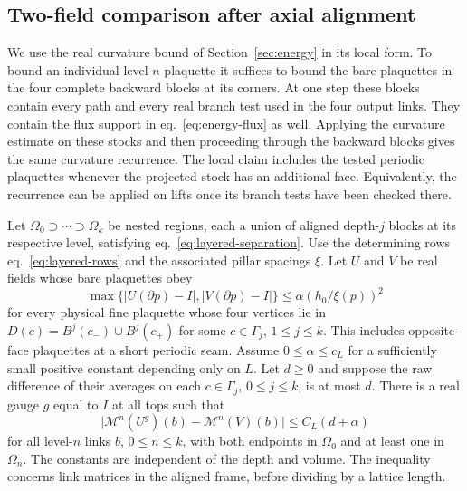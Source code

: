 \documentclass[11pt,letterpaper,reqno]{amsart}
\makeatletter
\numberwithin{equation}{section}
\renewcommand{\eqref}[1]{\textup{eq.~\ref{#1}}}
\theoremstyle{definition}
\newcommand{\ms@minorstart}{%
  \pushQED{\qed}\renewcommand{\qedsymbol}{$\blacksquare$}}
\newenvironment{proposition}[1][]{\ms@minorstart\ms@proposition[#1]}
  {\popQED\endms@proposition}
\theoremstyle{remark}
\makeatother
\begin{document}
\subsection{Two-field comparison after axial alignment}\label{sec:layered-rigidity}

We use the real curvature bound of Section~\ref{sec:energy} in its
local form. To bound an individual level-$n$ plaquette it suffices
to bound the bare plaquettes in the four complete backward blocks
at its corners. At one step these blocks contain every path and
every real branch test used in the four output links. They contain
the flux support in \eqref{eq:energy-flux} as well. Applying the
curvature estimate on these stocks and then proceeding through the
backward blocks gives the same curvature recurrence. The local
claim includes the tested periodic plaquettes whenever the projected
stock has an additional face. Equivalently, the recurrence can be
applied on lifts once its branch tests have been checked there.

\begin{proposition}[Depth-uniform raw rigidity]\label{prop:layered-rigidity}
Let $\Omega_0\supset\cdots\supset\Omega_k$ be nested regions,
each a union of aligned depth-$j$ blocks at its respective level,
satisfying \eqref{eq:layered-separation}. Use the determining rows
\eqref{eq:layered-rows} and the associated pillar spacings $\xi$.
Let $U$ and $V$ be real fields
whose bare plaquettes obey
\begin{equation}\label{eq:layered-rigidity-curvature}
 \max\big\{|U(\partial p)-I|,|V(\partial p)-I|\big\}
       \le \alpha(h_0/\xi(p))^2
\end{equation}
for every physical fine plaquette whose four vertices lie in
\(D(c)=B^j(c_-)\cup B^j(c_+)\) for some \(c\in\Gamma_j\),
\(1\le j\le k\). This includes opposite-face plaquettes at a
short periodic seam. Assume \(0\le\alpha\le c_L\) for a sufficiently
small positive constant depending only on \(L\).
Let $d\ge0$ and suppose the raw difference of their averages on each
$c\in\Gamma_j$, $0\le j\le k$, is at most $d$. There is a real
gauge $g$ equal to $I$ at all tops such that
\begin{equation}\label{eq:layered-rigidity-result}
 \big|\mathcal M^n(U^g)(b)-\mathcal M^n(V)(b)\big|
       \le C_L(d+\alpha)
\end{equation}
for all level-$n$ links $b$, \(0\le n\le k\), with both endpoints in $\Omega_0$ and
at least one in $\Omega_n$. The constants are independent of the
depth and volume. The inequality concerns link matrices in the
aligned frame, before dividing by a lattice length.
\end{proposition}
\end{document}
